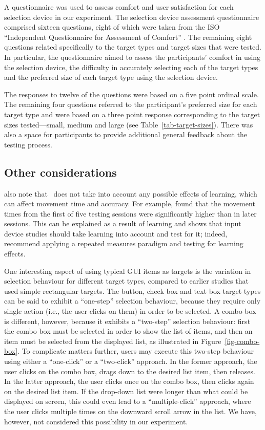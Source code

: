 \documentclass[reviewcopy]{elsart}
\begin{document}
A questionnaire was used to assess comfort and user satisfaction for
each selection device in our experiment. The selection device assessment
questionnaire comprised sixteen questions, eight of which were taken
from the ISO ``Independent Questionnaire for Assessment of Comfort''
\citep{Doug-SA-1999-CHI}. The remaining eight questions related
specifically to the target types and target sizes that were tested. In
particular, the questionnaire aimed to assess the participants' comfort
in using the selection device, the difficulty in accurately selecting each
of the target types and the preferred size of each target type using the
selection device.

The responses to twelve of the questions were based on a five point
ordinal scale. The remaining four questions referred to the
participant's preferred size for each target type and were based on a
three point response corresponding to the target sizes tested---small,
medium and large (see Table~\ref{tab-target-sizes}). There was also a
space for participants to provide additional general feedback about the
testing process.


\subsection{Other considerations}
\label{sec-evaluation-other}

\citet{Doug-SA-1999-CHI} also note that \ISOnine\ does not take into
account any possible effects of learning, which can affect movement time
and accuracy. For example, \citet{Mack-IS-1991} found that the movement
times from the first of five testing sessions were significantly higher
than in later sessions. This can be explained as a result of learning
and shows that input device studies should take learning into account
and test for it; indeed, \citet{Doug-SA-1999-CHI} recommend applying a
repeated measures paradigm and testing for learning effects.

One interesting aspect of using typical GUI items as targets is the
variation in selection behaviour for different target types, compared to
earlier studies that used simple rectangular targets. The button, check
box and text box target types can be said to exhibit a ``one-step''
selection behaviour, because they require only single action (i.e., the
user clicks on them) in order to be selected. A combo box is different,
however, because it exhibits a ``two-step'' selection behaviour: first
the combo box must be selected in order to show the list of items, and
then an item must be selected from the displayed list, as illustrated in
Figure~\ref{fig-combo-box}. To complicate matters further, users may
execute this two-step behaviour using either a ``one-click'' or a
``two-click'' approach. In the former approach, the user clicks on the
combo box, drags down to the desired list item, then releases. In the
latter approach, the user clicks once on the combo box, then clicks
again on the desired list item. If the drop-down list were longer than
what could be displayed on screen, this could even lead to a
``multiple-click'' approach, where the user clicks multiple times on the
downward scroll arrow in the list. We have, however, not considered this
possibility in our experiment.
\end{document}
